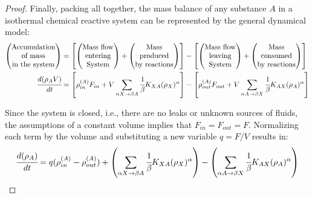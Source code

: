 \documentclass[a4paper,11pt]{book}
\numberwithin{figure}{chapter}
\numberwithin{equation}{chapter}
\numberwithin{table}{chapter}
\theoremstyle{definition}
\begin{document}
\begin{proof}
    Finally, packing all together, the mass balance of any substance $A$ in a isothermal chemical reactive system can be represented by the general dynamical model:
    \begin{equation}
    \begin{split}
        \begin{pmatrix}
		\text{Accumulation} \\ \text{of mass} \\ \text{in the system}
	\end{pmatrix} &= \left[ \begin{pmatrix}
		\text{Mass flow} \\ \text{entering} \\ \text{System}
	\end{pmatrix} + \begin{pmatrix}
		\text{Mass} \\  \text{produced} \\ \text{by reactions}
	\end{pmatrix} \right] - \left[ \begin{pmatrix}
		\text{Mass flow} \\ \text{leaving} \\ \text{System}
	\end{pmatrix} + \begin{pmatrix}
		\text{Mass} \\ \text{consumed} \\ \text{by reactions}
	\end{pmatrix} \right] \\
		\cfrac{d (\rho_A V)}{dt} &= \left[ \rho^{(A)}_{in} F_{in} + V \sum_{\alpha X \rightarrow \beta A} \cfrac{1}{\beta} K_{XA} (\rho_X)^{\alpha} \right] - \left[ \rho^{(A)}_{out} F_{out} + V \sum_{\alpha A \rightarrow \beta X} \cfrac{1}{\beta} K_{AX} (\rho_A)^{\alpha} \right]
    \end{split}
    \end{equation}
    
    Since the system is closed, i.e., there are no leaks or unknown sources of fluids, the assumptions of a constant volume implies that $F_{in} = F_{out} = F$. Normalizing each term by the volume and substituting a new variable $q = F/V$ results in:
    \begin{equation} \label{eq:isoModel3}
    		\cfrac{d (\rho_A)}{dt} = q (\rho^{(A)}_{in} - \rho^{(A)}_{out}) + \left( \sum_{\alpha X \rightarrow \beta A} \cfrac{1}{\beta} K_{XA} (\rho_X)^{\alpha} \right) - \left(\sum_{\alpha A \rightarrow \beta X} \cfrac{1}{\beta} K_{AX} (\rho_A)^{\alpha} \right)
    \end{equation}
\end{proof}
\end{document}

